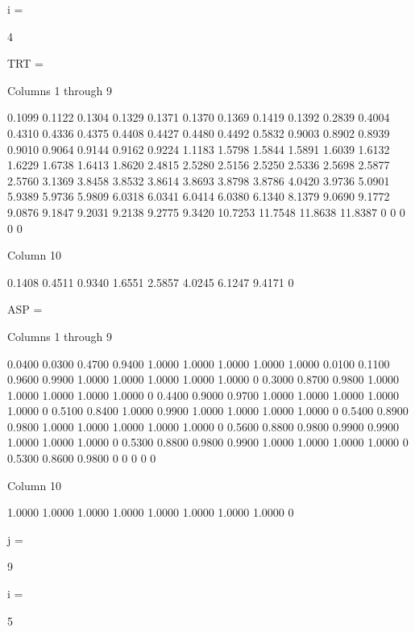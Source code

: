 i =

     4


TRT =

  Columns 1 through 9

    0.1099    0.1122    0.1304    0.1329    0.1371    0.1370    0.1369    0.1419    0.1392
    0.2839    0.4004    0.4310    0.4336    0.4375    0.4408    0.4427    0.4480    0.4492
    0.5832    0.9003    0.8902    0.8939    0.9010    0.9064    0.9144    0.9162    0.9224
    1.1183    1.5798    1.5844    1.5891    1.6039    1.6132    1.6229    1.6738    1.6413
    1.8620    2.4815    2.5280    2.5156    2.5250    2.5336    2.5698    2.5877    2.5760
    3.1369    3.8458    3.8532    3.8614    3.8693    3.8798    3.8786    4.0420    3.9736
    5.0901    5.9389    5.9736    5.9809    6.0318    6.0341    6.0414    6.0380    6.1340
    8.1379    9.0690    9.1772    9.0876    9.1847    9.2031    9.2138    9.2775    9.3420
   10.7253   11.7548   11.8638   11.8387         0         0         0         0         0

  Column 10

    0.1408
    0.4511
    0.9340
    1.6551
    2.5857
    4.0245
    6.1247
    9.4171
         0


ASP =

  Columns 1 through 9

    0.0400    0.0300    0.4700    0.9400    1.0000    1.0000    1.0000    1.0000    1.0000
    0.0100    0.1100    0.9600    0.9900    1.0000    1.0000    1.0000    1.0000    1.0000
         0    0.3000    0.8700    0.9800    1.0000    1.0000    1.0000    1.0000    1.0000
         0    0.4400    0.9000    0.9700    1.0000    1.0000    1.0000    1.0000    1.0000
         0    0.5100    0.8400    1.0000    0.9900    1.0000    1.0000    1.0000    1.0000
         0    0.5400    0.8900    0.9800    1.0000    1.0000    1.0000    1.0000    1.0000
         0    0.5600    0.8800    0.9800    0.9900    0.9900    1.0000    1.0000    1.0000
         0    0.5300    0.8800    0.9800    0.9900    1.0000    1.0000    1.0000    1.0000
         0    0.5300    0.8600    0.9800         0         0         0         0         0

  Column 10

    1.0000
    1.0000
    1.0000
    1.0000
    1.0000
    1.0000
    1.0000
    1.0000
         0


j =

     9


i =

     5


